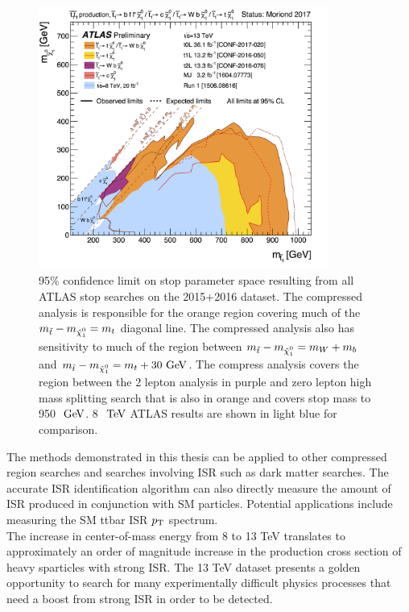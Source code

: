 \begin{figure}[htbp]
	\begin{center}
		\includegraphics[width=0.85\textwidth]{figures/8TeV/ATLAS_SUSY_Stop_tLSP.png}
		\caption[95\% confidence limit on stop parameter space resulting from all ATLAS stop searches on the 2015+2016 dataset]{95\% confidence limit on stop parameter space resulting from all ATLAS stop searches on the 2015+2016 dataset.  The compressed analysis is responsible for the orange region covering much of the $m_{\stop}-m_{\ninoone} = m_t$ diagonal line.  The compressed analysis also has sensitivity to much of the region between $m_{\stop}-m_{\ninoone} = m_W + m_b$ and $m_{\stop}-m_{\ninoone} = m_t + 30 \gev$.  The compress analysis covers the region between the 2 lepton analysis in purple and zero lepton high mass splitting search that is also in orange and covers stop mass to 950 $\gev$.  8 $\tev$ ATLAS results are shown in light blue for comparison.  }
		\label{figure.exclusion.All2016}
	\end{center}
\end{figure}

\indent The methods demonstrated in this thesis can be applied to other compressed region searches and searches involving ISR such as dark matter searches.  The accurate ISR identification algorithm can also directly measure the amount of ISR produced in conjunction with SM particles. Potential applications include measuring the SM ttbar ISR $p_{\mathrm{T}}$ spectrum. \\

\indent  The increase in center-of-mass energy from 8 to 13 TeV translates to approximately an order of magnitude increase in the production cross section of heavy sparticles with strong ISR.  The 13 TeV dataset presents a golden opportunity to search for many experimentally difficult physics processes that need a boost from strong ISR in order to be detected. \\

